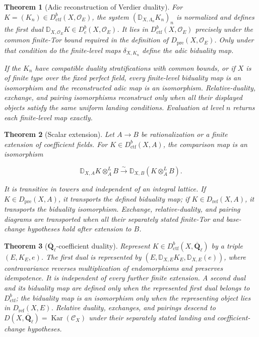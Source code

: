 \documentclass[10pt]{article}
\newtheorem{theorem}{Theorem}[section]
\theoremstyle{definition}
\newcommand{\Qlb}{\overline{\mathbf Q}_\ell}
\newcommand{\OO}{\mathcal O}
\newcommand{\Dbc}{D^b_c}
\newcommand{\Dctf}{D^b_{\mathrm{ctf}}}
\newcommand{\DD}{\mathbb D}
\begin{document}
\begin{theorem}[Adic reconstruction of Verdier duality]
For \(K=(K_n)\in\Dctf(X,\OO_E)\), the system
\((\DD_{X,\Lambda_n}K_n)_n\) is normalized and defines the first dual
\(\DD_{X,\OO_E}K\in\Dbc(X,\OO_E)\).  It lies in
\(\Dctf(X,\OO_E)\) precisely under the common finite-Tor bound required in
the definition of \(D_{\mathrm{pre}}(X,\OO_E)\).  Only under that condition
do the finite-level maps \(\delta_{X,K_n}\) define the adic biduality map.

If the \(K_n\) have compatible duality stratifications with common bounds,
or if \(X\) is of finite type over the fixed perfect field, every finite-level
biduality map is an isomorphism and the reconstructed adic map is an
isomorphism.  Relative-duality, exchange, and pairing isomorphisms reconstruct
only when all their displayed objects satisfy the same uniform landing
conditions.  Evaluation at level \(n\) returns each finite-level map exactly.
\end{theorem}

\begin{theorem}[Scalar extension]
Let \(A\to B\) be rationalization or a finite extension of coefficient
fields.  For \(K\in\Dctf(X,A)\), the comparison map is an isomorphism

\[
 \DD_{X,A}K\otimes_A^LB
 \xrightarrow{\sim}
 \DD_{X,B}(K\otimes_A^LB).
\]

It is transitive in towers and independent of an integral lattice.  If
\(K\in D_{\mathrm{pre}}(X,A)\), it transports the defined biduality map; if
\(K\in D_{\mathrm{ref}}(X,A)\), it transports the biduality isomorphism.
Exchange, relative-duality, and pairing diagrams are transported when all
their separately stated finite-Tor and base-change hypotheses hold after
extension to \(B\).
\end{theorem}

\begin{theorem}[\(\Qlb\)-coefficient duality]
Represent \(K\in\Dctf(X,\Qlb)\) by a triple \((E,K_E,e)\).  The first dual
is represented by \((E,\DD_{X,E}K_E,\DD_{X,E}(e))\), where contravariance
reverses multiplication of endomorphisms and preserves idempotence.  It is
independent of every further finite extension.  A second dual and its
biduality map are defined only when the represented first dual belongs to
\(\Dctf\); the biduality map is an isomorphism only when the representing
object lies in \(D_{\mathrm{ref}}(X,E)\).  Relative duality, exchanges, and
pairings descend to \(D(X,\Qlb)=\operatorname{Kar}(\mathcal C_X)\) under
their separately stated landing and coefficient-change hypotheses.
\end{theorem}
\end{document}
